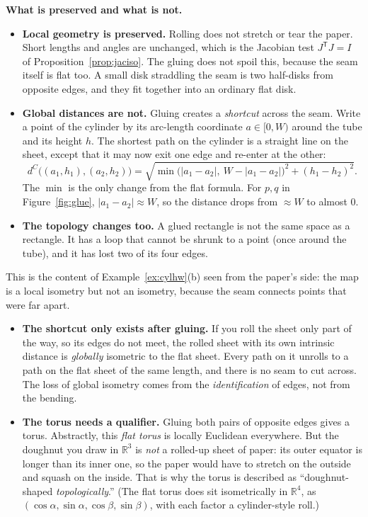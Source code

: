 \documentclass[11pt]{article}
\newcommand{\R}{\mathbb{R}}
\newcommand{\T}{^{\mathsf T}}
\begin{document}
\begin{intuition}
\textbf{What is preserved and what is not.}
\begin{itemize}[nosep,leftmargin=*]
\item \textbf{Local geometry is preserved.} Rolling does not stretch or tear the paper. Short lengths and angles are unchanged, which is the
Jacobian test $J\T J=I$ of Proposition~\ref{prop:jaciso}. The gluing does not spoil this, because the seam itself is flat too. A small disk
straddling the seam is two half-disks from opposite edges, and they fit together into an ordinary flat disk.
\item \textbf{Global distances are not.} Gluing creates a \emph{shortcut} across the seam. Write a point of the cylinder by its arc-length coordinate
$a\in[0,W)$ around the tube and its height $h$. The shortest path on the cylinder is a straight line on the sheet, except that it may now exit
one edge and re-enter at the other:
\[
d^{C}\big((a_1,h_1),(a_2,h_2)\big)=\sqrt{\min\big(|a_1-a_2|,\ W-|a_1-a_2|\big)^2+(h_1-h_2)^2}.
\]
The $\min$ is the only change from the flat formula. For $p,q$ in Figure~\ref{fig:glue}, $|a_1-a_2|\approx W$, so the distance drops from
$\approx W$ to almost $0$.
\item \textbf{The topology changes too.} A glued rectangle is not the same space as a rectangle. It has a loop that cannot be shrunk to a point (once around
the tube), and it has lost two of its four edges.
\end{itemize}
This is the content of Example~\ref{ex:cylhw}(b) seen from the paper's side: the map is a local isometry but not an isometry, because the seam
connects points that were far apart.
\end{intuition}

\begin{careful}
\begin{itemize}[nosep,leftmargin=*]
\item \textbf{The shortcut only exists after gluing.} If you roll the sheet only part of the way, so its edges do not meet, the rolled sheet with
its own intrinsic distance is \emph{globally} isometric to the flat sheet. Every path on it unrolls to a path on the flat sheet of the same length, and
there is no seam to cut across. The loss of global isometry comes from the \emph{identification} of edges, not from the bending.
\item \textbf{The torus needs a qualifier.} Gluing both pairs of opposite edges gives a torus. Abstractly, this \emph{flat torus} is locally
Euclidean everywhere. But the doughnut you draw in $\R^3$ is \emph{not} a rolled-up sheet of paper: its outer equator is longer than its inner one,
so the paper would have to stretch on the outside and squash on the inside. That is why the torus is described as ``doughnut-shaped \emph{topologically}.''
(The flat torus does sit isometrically in $\R^4$, as $(\cos\alpha,\sin\alpha,\cos\beta,\sin\beta)$, with each factor a cylinder-style roll.)
\end{itemize}
\end{careful}
\end{document}
